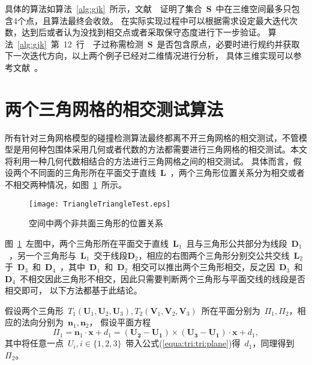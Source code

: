 具体的算法如算法~\ref{alg:gjk}~所示，文献~~证明了集合~$\bm{S}$~中在三维空间最多只包含4个点，且算法最终会收敛。
在实际实现过程中可以根据需求设定最大迭代次数，达到后或者认为没找到相交点或者采取保守态度进行下一步验证。
算法~\ref{alg:gjk}~第~12~行~~子过称需检测~$\bm{S}$~是否包含原点，必要时进行规约并获取下一次迭代方向，以上两个例子已经对二维情况进行分析，
具体三维实现可以参考文献~。

\FloatBarrier
\section{两个三角网格的相交测试算法}
\label{sec:intersection:triangles}

所有针对三角网格模型的碰撞检测算法最终都离不开三角网格的相交测试，不管模型是用何种包围体采用几何或者代数的方法都需要进行三角网格的相交测试。本文将利用一种几何代数相结合的方法进行三角网格之间的相交测试。
具体而言，假设两个不同面的三角形所在平面交于直线~$\bm{L}$~，两个三角形位置关系分为相交或者不相交两种情况，如图~\ref{fig:two:triangle:ui}~所示。

\begin{figure}[!ht]
  \centering
    \texttt{[image: TriangleTriangleTest.eps]}
    \caption{空间中两个非共面三角形的位置关系\cite{Moller1997}}
  \label{fig:two:triangle:ui}
\end{figure}

图~\ref{fig:two:triangle:ui}~左图中，两个三角形所在平面交于直线~$\bm{L}_1$~且与三角形公共部分为线段~$\bm{D}_1$~，另一个三角形与~$\bm{L}_1$~交于线段$\bm{D}_2$，相应的右图两个三角形分别交公共交线~$\bm{L}_2$~
于~$\bm{D}_3$~和~$\bm{D}_4$~，其中~$\bm{D}_1$~和~$\bm{D}_2$~相交可以推出两个三角形相交，反之因~$\bm{D}_3$~和~$\bm{D}_4$~不相交因此三角形不相交，因此只需要判断两个三角形与平面交线的线段是否相交即可\cite{Moller1997}，
以下方法都基于此结论。

假设两个三角形~$T_1(\bm{U}_1,\bm{U}_2,\bm{U}_3), T_2(\bm{V}_1,\bm{V}_2,\bm{V}_3)$~所在平面分别为~$\Pi_1, \Pi_2$，相应的法向分别为~$\bm{n}_1, \bm{n}_2$，
假设平面方程~
\begin{equation}
  \Pi_1 = \bm{n}_1 \cdot \bm{x}+d_1 = (\bm{U_2} - \bm{U_1}) \times (\bm{U_3}-\bm{U_1})  \cdot \bm{x} + d_1,
\label{equa:tri:tri:plane}
\end{equation}
其中将任意一点~$U_i, i \in \{1,2,3\}$~带入公式(\ref{equa:tri:tri:plane})得~$d_1$，同理得到~$\Pi_2$。

